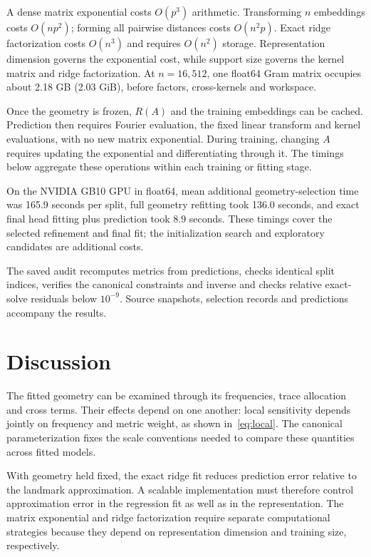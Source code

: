 \documentclass[11pt]{article}
\begin{document}
A dense matrix exponential costs $O(p^3)$ arithmetic. Transforming $n$ embeddings costs $O(np^2)$; forming all pairwise distances costs $O(n^2p)$. Exact ridge factorization costs $O(n^3)$ and requires $O(n^2)$ storage. Representation dimension governs the exponential cost, while support size governs the kernel matrix and ridge factorization. At $n=16{,}512$, one float64 Gram matrix occupies about 2.18 GB (2.03 GiB), before factors, cross-kernels and workspace.

Once the geometry is frozen, $R(A)$ and the training embeddings can be cached. Prediction then requires Fourier evaluation, the fixed linear transform and kernel evaluations, with no new matrix exponential. During training, changing $A$ requires updating the exponential and differentiating through it. The timings below aggregate these operations within each training or fitting stage.

On the NVIDIA GB10 GPU in float64, mean additional geometry-selection time was 165.9 seconds per split, full geometry refitting took 136.0 seconds, and exact final head fitting plus prediction took 8.9 seconds. These timings cover the selected refinement and final fit; the initialization search and exploratory candidates are additional costs.

The saved audit recomputes metrics from predictions, checks identical split indices, verifies the canonical constraints and inverse and checks relative exact-solve residuals below $10^{-9}$. Source snapshots, selection records and predictions accompany the results.



\section{Discussion}
The fitted geometry can be examined through its frequencies, trace allocation and cross terms. Their effects depend on one another: local sensitivity depends jointly on frequency and metric weight, as shown in~\eqref{eq:local}. The canonical parameterization fixes the scale conventions needed to compare these quantities across fitted models.

With geometry held fixed, the exact ridge fit reduces prediction error relative to the landmark approximation. A scalable implementation must therefore control approximation error in the regression fit as well as in the representation. The matrix exponential and ridge factorization require separate computational strategies because they depend on representation dimension and training size, respectively.
\end{document}
